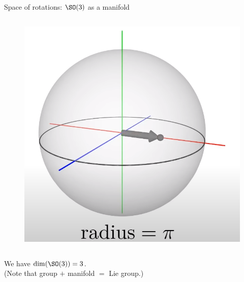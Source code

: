 \documentclass[9pt]{beamer}
\begin{document}
\begin{frame}{Space of rotations: $\SO(3)$ as a manifold}
\begin{columns}[T,onlytextwidth]
            \begin{figure}
                \centering
                \includegraphics[scale=0.16]{Pictures/SO3sphere.png}
            \end{figure}
  
    \end{columns}

    We have $\dim(\SO(3))=3$.\\[0.2cm]
    (Note that group $+$ manifold $=$ Lie group.)
    
\end{frame}
\end{document}
